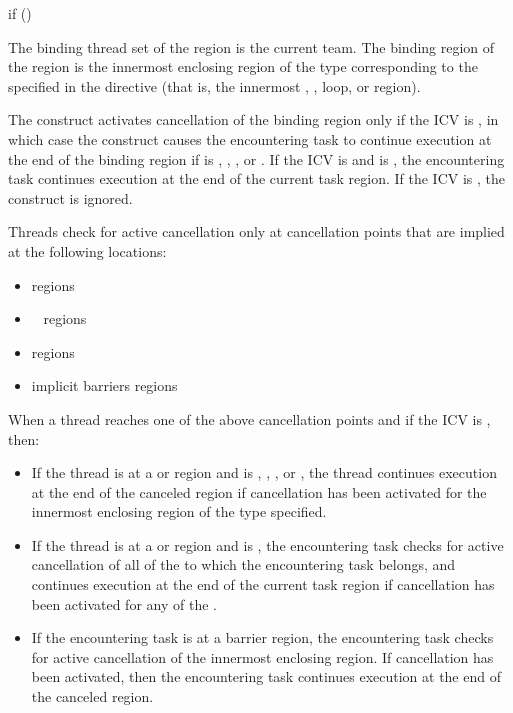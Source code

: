 \begin{indentedcodelist}
if ()
\end{indentedcodelist}
\fortranspecificend

\binding
The binding thread set of the  region is the current team.
The binding region of the  region 
is the innermost enclosing region of the type corresponding to the  
specified in the directive (that is, the innermost , , loop, or 
 region).

\descr
The  construct activates cancellation of the binding region only if the  ICV
is , in which case the  construct causes the encountering task to continue execution 
at the end of the binding region if  is , , , or . 
If the  ICV is  and  is , the encountering task continues execution at the end of the current task region.
If the  ICV is , the  construct is 
ignored.

Threads check for active cancellation only at cancellation points that are 
implied at the following locations:

\begin{itemize}
\item {} regions
\item {}~ regions
\item {} regions
\item implicit barriers regions
\end{itemize}

When a thread reaches one of the above cancellation points and if the  ICV is ,  then:
\begin{itemize}
\item If the thread is at a  or  region 
and  is , , , or 
, the thread continues execution at the end of the canceled 
region if cancellation has been activated for the innermost enclosing region 
of the type specified.

\item If the thread is at a  or  region 
and  is , the encountering task 
checks for active cancellation of all of the  to which the 
encountering task belongs, and continues execution at the end of the current 
task region if cancellation has been activated for any of the .

\item If the encountering task is at a barrier region, the encountering task 
checks for active cancellation of the innermost enclosing  
region. If cancellation has been activated, then the encountering task 
continues execution at the end of the canceled region.
\end{itemize}

